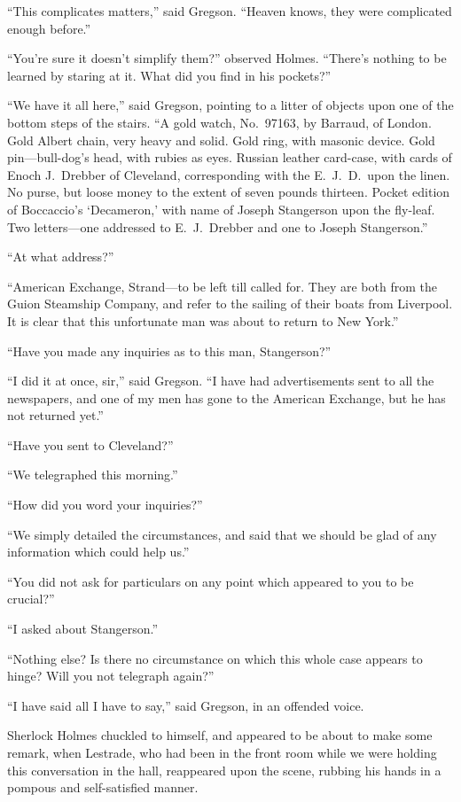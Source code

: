 \documentclass[12pt,english,oneside]{book}
\newcommand{\mdsh}[1]{\mbox{#1}\linebreak[1]}
\begin{document}
{}``This complicates matters,'' said Gregson. {}``Heaven knows,
they were complicated enough before.''

{}``You're sure it doesn't simplify them?'' observed Holmes. {}``There's
nothing to be learned by staring at it. What did you find in his pockets?''

{}``We have it all here,'' said Gregson, pointing to a litter of
objects upon one of the bottom steps of the stairs. {}``A gold watch,
No.\ 97163, by Barraud, of London. Gold Albert chain, very heavy
and solid. Gold ring, with masonic device. Gold pin\mdsh{---}bull-dog's
head, with rubies as eyes. Russian leather card-case, with cards of
Enoch J.\ Drebber of Cleveland, corresponding with the E.\ J.\ D.\ upon
the linen. No purse, but loose money to the extent of seven pounds
thirteen. Pocket edition of Boccaccio's `Decameron,' with name of
Joseph Stangerson upon the fly-leaf. Two letters\mdsh{---}one addressed
to E.\ J.\ Drebber and one to Joseph Stangerson.''

{}``At what address?''

{}``American Exchange, Strand\mdsh{---}to be left till called for.
They are both from the Guion Steamship Company, and refer to the sailing
of their boats from Liverpool. It is clear that this unfortunate man
was about to return to New York.''

{}``Have you made any inquiries as to this man, Stangerson?''

{}``I did it at once, sir,'' said Gregson. {}``I have had advertisements
sent to all the newspapers, and one of my men has gone to the American
Exchange, but he has not returned yet.''

{}``Have you sent to Cleveland?''

{}``We telegraphed this morning.''

{}``How did you word your inquiries?''

{}``We simply detailed the circumstances, and said that we should
be glad of any information which could help us.''

{}``You did not ask for particulars on any point which appeared to
you to be crucial?''

{}``I asked about Stangerson.''

{}``Nothing else? Is there no circumstance on which this whole case
appears to hinge? Will you not telegraph again?''

{}``I have said all I have to say,'' said Gregson, in an offended
voice.

Sherlock Holmes chuckled to himself, and appeared to be about to make
some remark, when Lestrade, who had been in the front room while we
were holding this conversation in the hall, reappeared upon the scene,
rubbing his hands in a pompous and self-satisfied manner.
\end{document}
